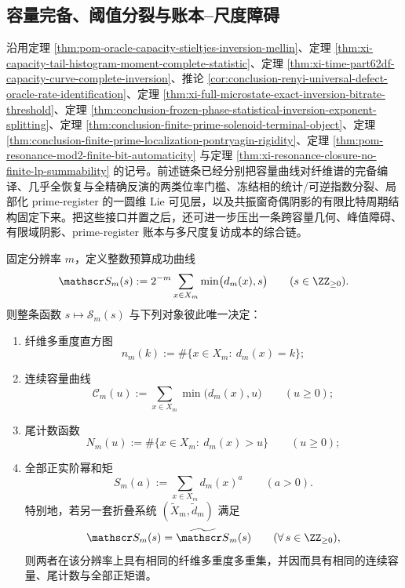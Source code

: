 \subsection{容量完备、阈值分裂与账本--尺度障碍}\label{subsec:conclusion-capacity-threshold-shadow-ledger-scale-obstruction}
沿用定理 \ref{thm:pom-oracle-capacity-stieltjes-inversion-mellin}、定理 \ref{thm:xi-capacity-tail-histogram-moment-complete-statistic}、定理 \ref{thm:xi-time-part62df-capacity-curve-complete-inversion}、推论 \ref{cor:conclusion-renyi-universal-defect-oracle-rate-identification}、定理 \ref{thm:xi-full-microstate-exact-inversion-bitrate-threshold}、定理 \ref{thm:conclusion-frozen-phase-statistical-inversion-exponent-splitting}、定理 \ref{thm:conclusion-finite-prime-solenoid-terminal-object}、定理 \ref{thm:conclusion-finite-prime-localization-pontryagin-rigidity}、定理 \ref{thm:pom-resonance-mod2-finite-bit-automaticity} 与定理 \ref{thm:xi-resonance-closure-no-finite-lp-summability} 的记号。前述链条已经分别把容量曲线对纤维谱的完备编译、几乎全恢复与全精确反演的两类位率门槛、冻结相的统计/可逆指数分裂、局部化 prime-register 的一圆维 Lie 可见层，以及共振窗奇偶阴影的有限比特周期结构固定下来。把这些接口并置之后，还可进一步压出一条跨容量几何、峰值障碍、有限域阴影、prime-register 账本与多尺度复访成本的综合链。

\begin{theorem}[整数预算成功曲线的完备决定性]\label{thm:conclusion-integer-budget-curve-complete-profile}
固定分辨率 \(m\)，定义整数预算成功曲线
\[
\mathscr S_m(s)
:=
2^{-m}\sum_{x\in X_m}\min\bigl(d_m(x),s\bigr)
\qquad (s\in\ZZ_{\ge 0}).
\]
则整条函数 \(s\mapsto \mathscr S_m(s)\) 与下列对象彼此唯一决定：
\begin{enumerate}
  \item 纤维多重度直方图
  \[
  n_m(k):=\#\{x\in X_m:\ d_m(x)=k\};
  \]
  \item 连续容量曲线
  \[
  \mathcal C_m(u):=\sum_{x\in X_m}\min\bigl(d_m(x),u\bigr)\qquad (u\ge 0);
  \]
  \item 尾计数函数
  \[
  N_m(u):=\#\{x\in X_m:\ d_m(x)>u\}\qquad (u\ge 0);
  \]
  \item 全部正实阶幂和矩
  \[
  S_m(a):=\sum_{x\in X_m}d_m(x)^a\qquad (a>0).
  \]
特别地，若另一套折叠系统 \((\widetilde X_m,\widetilde d_m)\) 满足
\[
\mathscr S_m(s)=\widetilde{\mathscr S}_m(s)
\qquad (\forall\, s\in\ZZ_{\ge 0}),
\]
则两者在该分辨率上具有相同的纤维多重度多重集，并因而具有相同的连续容量、尾计数与全部正矩谱。
\end{enumerate}
\end{theorem}

